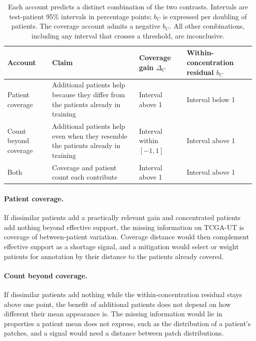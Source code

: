 \documentclass[11pt]{article}
\begin{document}
\begin{table}[htbp]
\centering
\renewcommand{\arraystretch}{1.15}
\begin{tabularx}{\textwidth}{@{}lYYY@{}}
\toprule
Account & Claim & Coverage gain $\Delta_C$ & Within-concentration residual $b_C$ \\
\midrule
Patient coverage & Additional patients help because they differ from the patients already in training & Interval above 1 & Interval below 1 \\
\addlinespace
Count beyond coverage & Additional patients help even when they resemble the patients already in training & Interval within $[-1,1]$ & Interval above 1 \\
\addlinespace
Both & Coverage and patient count each contribute & Interval above 1 & Interval above 1 \\
\bottomrule
\end{tabularx}
\caption{Each account predicts a distinct combination of the two contrasts. Intervals are test-patient 95\% intervals in percentage points; $b_C$ is expressed per doubling of patients. The coverage account admits a negative $b_C$. All other combinations, including any interval that crosses a threshold, are inconclusive.}
\label{tab:accounts}
\end{table}

\paragraph{Patient coverage.}
If dissimilar patients add a practically relevant gain and concentrated patients add nothing beyond effective support, the missing information on TCGA-UT is coverage of between-patient variation. Coverage distance would then complement effective support as a shortage signal, and a mitigation would select or weight patients for annotation by their distance to the patients already covered.

\paragraph{Count beyond coverage.}
If dissimilar patients add nothing while the within-concentration residual stays above one point, the benefit of additional patients does not depend on how different their mean appearance is. The missing information would lie in properties a patient mean does not express, such as the distribution of a patient's patches, and a signal would need a distance between patch distributions.
\end{document}

